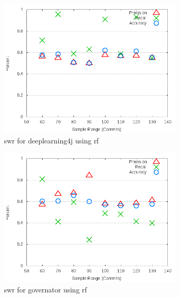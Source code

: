 \begin{figure}[!t]
\centering
\includegraphics[width=0.8\textwidth]{images/rf/test_1/deeplearning4j_sample_range.png}
\caption{\gls{swr} for deeplearning4j using \gls{rf}}
\label{fig:test_1_deeplearning4j_rf}
\end{figure}

\begin{figure}[!t]
\centering
\includegraphics[width=0.8\textwidth]{images/rf/test_1/governator_sample_range.png}
\caption{\gls{swr} for governator using \gls{rf}}
\label{fig:test_1_governator_rf}
\end{figure}

